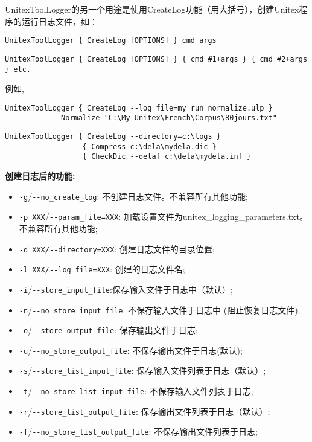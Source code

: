 UnitexToolLogger的另一个用途是使用CreateLog功能（用大括号），创建Unitex程序的运行日志文件，如：

\bigskip
\noindent \verb$UnitexToolLogger { CreateLog [OPTIONS] } cmd args$

\bigskip
\noindent \verb$UnitexToolLogger { CreateLog [OPTIONS] } { cmd #1+args } { cmd #2+args } etc.$

\noindent 例如,
\begin{verbatim}
UnitexToolLogger { CreateLog --log_file=my_run_normalize.ulp }
             Normalize "C:\My Unitex\French\Corpus\80jours.txt"
\end{verbatim}

\bigskip
\begin{verbatim}
UnitexToolLogger { CreateLog --directory=c:\logs }
                  { Compress c:\dela\mydela.dic }
                  { CheckDic --delaf c:\dela\mydela.inf }
\end{verbatim}

\bigskip
\noindent \textbf{创建日志后的功能:}
\begin{itemize}
\item \verb+-g+/\verb+--no_create_log+: 不创建日志文件。不兼容所有其他功能;

\item \verb+-p XXX+/\verb+--param_file=XXX+: 加载设置文件为unitex\_logging\_parameters.txt。不兼容所有其他功能;

\item \verb+-d XXX/--directory=XXX+: 创建日志文件的目录位置;
\item \verb+-l XXX/--log_file=XXX+: 创建的日志文件名;
\item \verb+-i+/\verb+--store_input_file+:保存输入文件于日志中（默认）;
\item \verb+-n+/\verb+--no_store_input_file+: 不保存输入文件于日志中 (阻止恢复日志文件);
\item \verb+-o+/\verb+--store_output_file+: 保存输出文件于日志;
\item \verb+-u+/\verb+--no_store_output_file+: 不保存输出文件于日志(默认);
\item \verb+-s+/\verb+--store_list_input_file+: 保存输入文件列表于日志（默认）;
\item \verb+-t+/\verb+--no_store_list_input_file+:  不保存输入文件列表于日志;
\item \verb+-r+/\verb+--store_list_output_file+: 保存输出文件列表于日志（默认）;
\item \verb+-f+/\verb+--no_store_list_output_file+: 不保存输出文件列表于日志;
\end{itemize}

